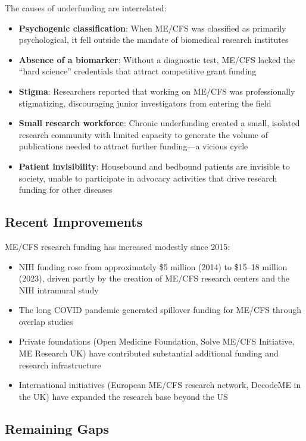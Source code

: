 The causes of underfunding are interrelated:

\begin{itemize}
    \item \textbf{Psychogenic classification}: When ME/CFS was classified as primarily psychological, it fell outside the mandate of biomedical research institutes
    \item \textbf{Absence of a biomarker}: Without a diagnostic test, ME/CFS lacked the ``hard science'' credentials that attract competitive grant funding
    \item \textbf{Stigma}: Researchers reported that working on ME/CFS was professionally stigmatizing, discouraging junior investigators from entering the field
    \item \textbf{Small research workforce}: Chronic underfunding created a small, isolated research community with limited capacity to generate the volume of publications needed to attract further funding---a vicious cycle
    \item \textbf{Patient invisibility}: Housebound and bedbound patients are invisible to society, unable to participate in advocacy activities that drive research funding for other diseases
\end{itemize}

\subsection{Recent Improvements}

ME/CFS research funding has increased modestly since 2015:

\begin{itemize}
    \item NIH funding rose from approximately \$5 million (2014) to \$15--18 million (2023), driven partly by the creation of ME/CFS research centers and the NIH intramural study
    \item The long COVID pandemic generated spillover funding for ME/CFS through overlap studies
    \item Private foundations (Open Medicine Foundation, Solve ME/CFS Initiative, ME Research UK) have contributed substantial additional funding and research infrastructure
    \item International initiatives (European ME/CFS research network, DecodeME in the UK) have expanded the research base beyond the US
\end{itemize}

\subsection{Remaining Gaps}

